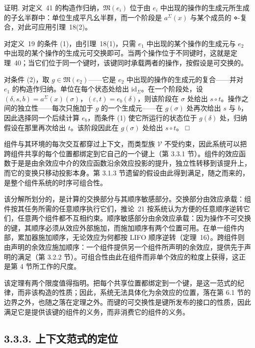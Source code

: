 证明. 对定义~41 的构造作归纳，\(\mathfrak { M } ( e _ { i } )\) 位于由 \(e _ { i }\) 中出现的操作的生成元所生成的子幺半群中：单位生成平凡幺半群，而一个阶段是 \(a ^ { \Sigma } ( x )\) 与某个成员的 ⋄-复合，对此可应用引理~18(2)。

对定义~19 的条件 (1)，由引理~18(1)，只需 \(e _ { 1 }\) 中出现的某个操作的生成元与 \(e _ { 2 }\) 中出现的某个操作的生成元可交换即可。当两个操作位于不同键时，这就是定理~40；当它们位于同一个键时，该键同时承载两者的操作，按假设是可交换的。

对条件 (2)，取 \(g \in \mathfrak { M } ( e _ { 2 } )\)——它是 \(e _ { 2 }\) 中出现的操作的生成元的复合——并对 \(e _ { 1 }\) 的构造作归纳。单位在每个状态处给出 \(\mathrm { i d } _ { \Sigma }\)。在一个阶段处，设 \(( \delta , s , b ) = a ^ { \Sigma } ( x ) ( \sigma )\)，\(( \varepsilon , t ) = e _ { b } ( \delta )\)，则该阶段在 \(\sigma\) 处给出 \(s \circ t\)。操作之间的独立性——每次只施加于 \(g\) 的一个生成元——在 \(g ( \sigma )\) 处再次给出 \(s\) 与 \(b\)，因此选择同一个后续计算 \(e _ { b }\)，而条件 (1) 使它所运行的状态位于 \(g ( \delta )\) 处，归纳假设在那里再次给出 \(t\)。该阶段因此在 \(g ( \sigma )\) 处给出 \(s \circ t\)。 □

组件与其环境的每次交互都穿过上下文，而类型族 \(\mathcal{V}\) 不受约束，因此系统可以把跨组件共享的每个位置都绑定到它自己的一个键上（第 3.3.1 节）。组件的效应函数于是是由余效应中介的效应函数沿余效应投影的提升，独立性转移到该提升上，而它的变换只移动投影本身。第 3.1.3 节遗留的假设由此得到满足，随之而来的，是整个组件系统的时序可组合性。

该分解所划分的，是计算的交换部分与其顺序敏感部分。交换部分由效应承载：组件按其任务所需的任意顺序执行它们，推论~21 按系统认为方便的任意顺序逆转它们，任意两个组件都不互相约束。顺序敏感部分由余效应承载：因为操作不可交换的键，其顺序必须从效应外部施加，而施加顺序有两个位置可用。在单一组件内部，累加器施加顺序，无论效应为何都按 LIFO 顺序逆转（定理~16）。跨组件则由声明的余效应施加顺序：一个组件提供另一个组件所声明的余效应，提供先于声明的满足（第 3.2.2 节）。可组合性由此在组件而非单个效应的粒度上获得，这正是第 4 节所工作的尺度。

该定理有两个限度值得指明。把每个共享位置都绑定到一个键，是这一范式的纪律，而非该构造的性质；因此，系统无法具体化为余效应的位置，落在第 6.1 节的边界之外，也随之落在定理之外。而键的可交换性是键所发布的接口的性质，因此满足它是提供该键的组件的义务，而非消费它的组件的义务。

\subsection{3.3.3. 上下文范式的定位}\label{situating-the-context-paradigm}

